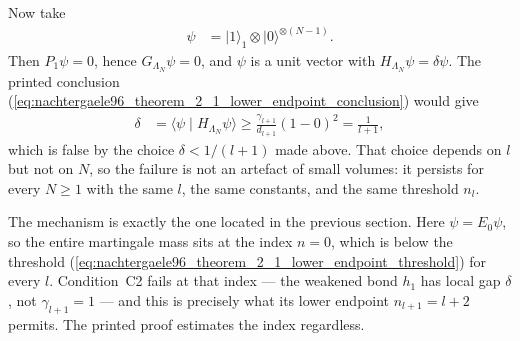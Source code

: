 \documentclass{article}
\begin{document}
Now take
\begin{align}
    \psi
        &=\lvert1\rangle_1\otimes\lvert0\rangle^{\otimes(N-1)}.
    \label{eq:nachtergaele96_theorem_2_1_lower_endpoint_model_vector}
\end{align}
Then $P_1\psi=0$, hence $G_{\Lambda_N}\psi=0$, and $\psi$ is a unit vector
with $H_{\Lambda_N}\psi=\delta\psi$. The printed conclusion
(\ref{eq:nachtergaele96_theorem_2_1_lower_endpoint_conclusion}) would give
\begin{align}
    \delta
        &=\langle\psi\mid H_{\Lambda_N}\psi\rangle
         \geq\frac{\gamma_{l+1}}{d_{l+1}}\left(1-0\right)^2
         =\frac{1}{l+1},
    \label{eq:nachtergaele96_theorem_2_1_lower_endpoint_contradiction}
\end{align}
which is false by the choice $\delta<1/(l+1)$ made above. That choice depends
on $l$ but not on $N$, so the failure is not an artefact of small volumes: it
persists for every $N\geq1$ with the same $l$, the same constants, and the
same threshold $n_l$.

The mechanism is exactly the one located in the previous section. Here
$\psi=E_0\psi$, so the entire martingale mass sits at the index $n=0$, which
is below the threshold
(\ref{eq:nachtergaele96_theorem_2_1_lower_endpoint_threshold}) for every $l$.
Condition~C2 fails at that index --- the weakened bond $h_1$ has local gap
$\delta$, not $\gamma_{l+1}=1$ --- and this is precisely what its lower
endpoint $n_{l+1}=l+2$ permits. The printed proof estimates the index
regardless.
\end{document}
